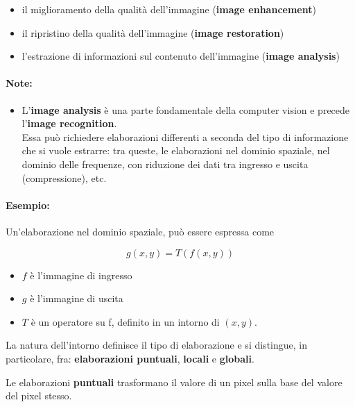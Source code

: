 \begin{itemize}
    \item il miglioramento della qualità dell'immagine (\textbf{image enhancement})
    \item il ripristino della qualità dell'immagine (\textbf{image restoration})
    \item l'estrazione di informazioni sul contenuto dell'immagine (\textbf{image analysis})
\end{itemize}

\paragraph{Note:}

\begin{itemize}
    \item L'\textbf{image analysis} è una parte fondamentale della computer vision e
          precede l'\textbf{image recognition}.\\
          Essa può richiedere elaborazioni differenti a seconda del tipo di
          informazione che si vuole estrarre: tra queste, le elaborazioni nel
          dominio spaziale, nel dominio delle frequenze, con riduzione dei
          dati tra ingresso e uscita (compressione), etc.
\end{itemize}

\paragraph{Esempio:}

Un'elaborazione nel dominio spaziale, può essere
espressa come

$$
    g(x , y) = T(f (x , y))
$$

\begin{itemize}
    \item $f$ è l'immagine di ingresso
    \item $g$ è l'immagine di uscita
    \item $T$ è un operatore su f, definito in un intorno di $(x , y)$.
\end{itemize}

La natura dell'intorno definisce il tipo di elaborazione e si distingue,
in particolare, fra: \textbf{elaborazioni puntuali}, \textbf{locali} e \textbf{globali}.

\begin{definition}
    Le elaborazioni \textbf{puntuali} trasformano il valore di un pixel sulla
    base del valore del pixel stesso.
\end{definition}

